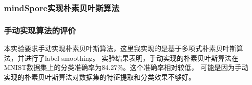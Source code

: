 \documentclass[12pt]{article}
\begin{document}







\subsubsection{mindSpore实现朴素贝叶斯算法}


\subsubsection{手动实现算法的评价}
本实验要求手动实现朴素贝叶斯算法，这里我实现的是基于多项式朴素贝叶斯算法，并进行了label smoothing。
实验结果表明，手动实现的朴素贝叶斯算法在MNIST数据集上的分类准确率为84.27\%。这个准确率相对较低，
可能是因为手动实现的朴素贝叶斯算法对数据集的特征提取和分类效果不够好。
\end{document}
